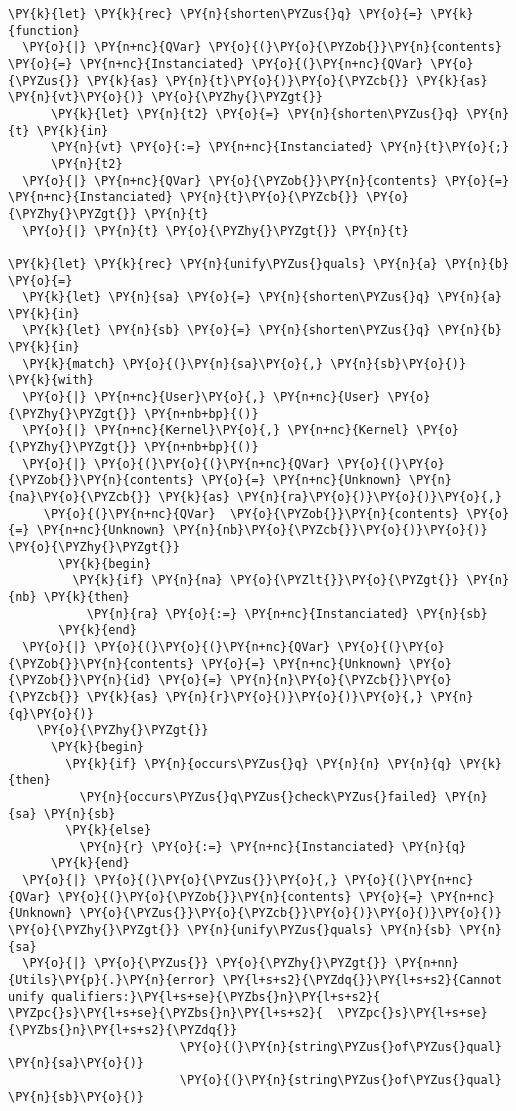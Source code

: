 \begin{Verbatim}[commandchars=\\\{\}]
\PY{k}{let} \PY{k}{rec} \PY{n}{shorten\PYZus{}q} \PY{o}{=} \PY{k}{function}
  \PY{o}{|} \PY{n+nc}{QVar} \PY{o}{(}\PY{o}{\PYZob{}}\PY{n}{contents} \PY{o}{=} \PY{n+nc}{Instanciated} \PY{o}{(}\PY{n+nc}{QVar} \PY{o}{\PYZus{}} \PY{k}{as} \PY{n}{t}\PY{o}{)}\PY{o}{\PYZcb{}} \PY{k}{as} \PY{n}{vt}\PY{o}{)} \PY{o}{\PYZhy{}\PYZgt{}}
      \PY{k}{let} \PY{n}{t2} \PY{o}{=} \PY{n}{shorten\PYZus{}q} \PY{n}{t} \PY{k}{in}
      \PY{n}{vt} \PY{o}{:=} \PY{n+nc}{Instanciated} \PY{n}{t}\PY{o}{;}
      \PY{n}{t2}
  \PY{o}{|} \PY{n+nc}{QVar} \PY{o}{\PYZob{}}\PY{n}{contents} \PY{o}{=} \PY{n+nc}{Instanciated} \PY{n}{t}\PY{o}{\PYZcb{}} \PY{o}{\PYZhy{}\PYZgt{}} \PY{n}{t}
  \PY{o}{|} \PY{n}{t} \PY{o}{\PYZhy{}\PYZgt{}} \PY{n}{t}

\PY{k}{let} \PY{k}{rec} \PY{n}{unify\PYZus{}quals} \PY{n}{a} \PY{n}{b} \PY{o}{=}
  \PY{k}{let} \PY{n}{sa} \PY{o}{=} \PY{n}{shorten\PYZus{}q} \PY{n}{a} \PY{k}{in}
  \PY{k}{let} \PY{n}{sb} \PY{o}{=} \PY{n}{shorten\PYZus{}q} \PY{n}{b} \PY{k}{in}
  \PY{k}{match} \PY{o}{(}\PY{n}{sa}\PY{o}{,} \PY{n}{sb}\PY{o}{)} \PY{k}{with}
  \PY{o}{|} \PY{n+nc}{User}\PY{o}{,} \PY{n+nc}{User} \PY{o}{\PYZhy{}\PYZgt{}} \PY{n+nb+bp}{()}
  \PY{o}{|} \PY{n+nc}{Kernel}\PY{o}{,} \PY{n+nc}{Kernel} \PY{o}{\PYZhy{}\PYZgt{}} \PY{n+nb+bp}{()}
  \PY{o}{|} \PY{o}{(}\PY{o}{(}\PY{n+nc}{QVar} \PY{o}{(}\PY{o}{\PYZob{}}\PY{n}{contents} \PY{o}{=} \PY{n+nc}{Unknown} \PY{n}{na}\PY{o}{\PYZcb{}} \PY{k}{as} \PY{n}{ra}\PY{o}{)}\PY{o}{)}\PY{o}{,}
     \PY{o}{(}\PY{n+nc}{QVar}  \PY{o}{\PYZob{}}\PY{n}{contents} \PY{o}{=} \PY{n+nc}{Unknown} \PY{n}{nb}\PY{o}{\PYZcb{}}\PY{o}{)}\PY{o}{)} \PY{o}{\PYZhy{}\PYZgt{}}
       \PY{k}{begin}
         \PY{k}{if} \PY{n}{na} \PY{o}{\PYZlt{}}\PY{o}{\PYZgt{}} \PY{n}{nb} \PY{k}{then}
           \PY{n}{ra} \PY{o}{:=} \PY{n+nc}{Instanciated} \PY{n}{sb}
       \PY{k}{end}
  \PY{o}{|} \PY{o}{(}\PY{o}{(}\PY{n+nc}{QVar} \PY{o}{(}\PY{o}{\PYZob{}}\PY{n}{contents} \PY{o}{=} \PY{n+nc}{Unknown} \PY{o}{\PYZob{}}\PY{n}{id} \PY{o}{=} \PY{n}{n}\PY{o}{\PYZcb{}}\PY{o}{\PYZcb{}} \PY{k}{as} \PY{n}{r}\PY{o}{)}\PY{o}{)}\PY{o}{,} \PY{n}{q}\PY{o}{)}
    \PY{o}{\PYZhy{}\PYZgt{}}
      \PY{k}{begin}
        \PY{k}{if} \PY{n}{occurs\PYZus{}q} \PY{n}{n} \PY{n}{q} \PY{k}{then}
          \PY{n}{occurs\PYZus{}q\PYZus{}check\PYZus{}failed} \PY{n}{sa} \PY{n}{sb}
        \PY{k}{else}
          \PY{n}{r} \PY{o}{:=} \PY{n+nc}{Instanciated} \PY{n}{q}
      \PY{k}{end}
  \PY{o}{|} \PY{o}{(}\PY{o}{\PYZus{}}\PY{o}{,} \PY{o}{(}\PY{n+nc}{QVar} \PY{o}{(}\PY{o}{\PYZob{}}\PY{n}{contents} \PY{o}{=} \PY{n+nc}{Unknown} \PY{o}{\PYZus{}}\PY{o}{\PYZcb{}}\PY{o}{)}\PY{o}{)}\PY{o}{)} \PY{o}{\PYZhy{}\PYZgt{}} \PY{n}{unify\PYZus{}quals} \PY{n}{sb} \PY{n}{sa}
  \PY{o}{|} \PY{o}{\PYZus{}} \PY{o}{\PYZhy{}\PYZgt{}} \PY{n+nn}{Utils}\PY{p}{.}\PY{n}{error} \PY{l+s+s2}{\PYZdq{}}\PY{l+s+s2}{Cannot unify qualifiers:}\PY{l+s+se}{\PYZbs{}n}\PY{l+s+s2}{  \PYZpc{}s}\PY{l+s+se}{\PYZbs{}n}\PY{l+s+s2}{  \PYZpc{}s}\PY{l+s+se}{\PYZbs{}n}\PY{l+s+s2}{\PYZdq{}}
                        \PY{o}{(}\PY{n}{string\PYZus{}of\PYZus{}qual} \PY{n}{sa}\PY{o}{)}
                        \PY{o}{(}\PY{n}{string\PYZus{}of\PYZus{}qual} \PY{n}{sb}\PY{o}{)}
\end{Verbatim}
